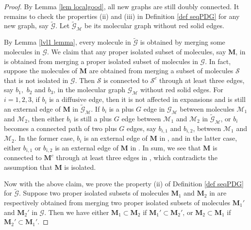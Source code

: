 \documentclass{article}
\newcommand{\1}{\mathds{1}}
\numberwithin{equation}{section}
\newcommand{\al}{\alpha}
\renewcommand{\cal}{\mathcal}
\newcommand{\wt}{\widetilde}
\newcommand{\dashed}{\text{diffusive}}
\theoremstyle{plain} %
\theoremstyle{remark}
\newcommand{\Pol}{{\mathbf{M}}}
\begin{document}
\begin{proof}
By Lemma \ref{lem localgood}, all new graphs are still doubly connected. It remains to check the properties (ii) and (iii) in Definition \ref{def seqPDG} for any new graph, say $\wt {\cal G}$. Let $\wt{\cal G}_{\cal M}$ be its molecular graph without red solid edges.

By Lemma \ref{lvl1 lemma}, every molecule in $\wt{\cal G}$ is obtained by merging some molecules in $\cal G$. We claim that any proper isolated subset of molecules, say $\Pol$, in \smash{$\wt{\cal G}$} is obtained from merging a proper isolated subset of molecules in $\cal G$. In fact, suppose the molecules of $\Pol$ are obtained from merging a subset of molecules $\cal S$ that is not isolated in $\cal G$. Then $\cal S$ is connected to $\cal S^c$ through at least three edges, say $b_1,$ $ b_2$ and $b_3$, in the molecular graph $\cal G_{\cal M}$ without red solid edges. For $i =1,2,3 $, if $b_i$ is a $\dashed$ edge, then it is not affected in expansions and is still an external edge of $\Pol$ in $\wt{\cal G}_{\cal M}$. If $b_i$ is a plus $G$ edge in $\cal G_{\cal M}$ between molecules $\cal M_1$ and $\cal M_2$, then either $b_i$ is still a plus $G$ edge between $\cal M_1$ and $\cal M_2$ in $\wt{\cal G}_{\cal M}$, or $b_i$ becomes a connected path of two plus $G$ edges, say $b_{i,1}$ and $b_{i,2}$, between $\cal M_1$ and $\cal M_2$. %
In the former case, $b_i$ is an external edge of $\Pol$ in \smash{$\wt{\cal G}_{\cal M}$}, and in the latter case, either $b_{i,1}$ or $b_{i,2}$ is an external edge of $\Pol$ in \smash{$\wt{\cal G}_{\cal M}$}. In sum, we see that $\Pol$ is connected to $\Pol^c$ through at least three edges in \smash{$\wt{\cal G}_{\cal M}$}, which contradicts the assumption that $\Pol$ is isolated. 

Now  with the above claim, we prove the property (ii) of Definition \ref{def seqPDG} for $\wt{\cal G}$. Suppose two proper isolated subsets of molecules $\Pol_1$ and $\Pol_2$ in \smash{$\wt{\cal G}$} are respectively obtained from merging two proper isolated subsets of molecules $\Pol_1'$ and $\Pol_2'$ in $\cal G$. Then we have either $\Pol_1 \subset \Pol_2$ if $ \Pol_1'\subset \Pol_2'$, or $\Pol_2 \subset \Pol_1$ if $ \Pol_2'\subset \Pol_1'$. %


\end{proof}
\end{document}
